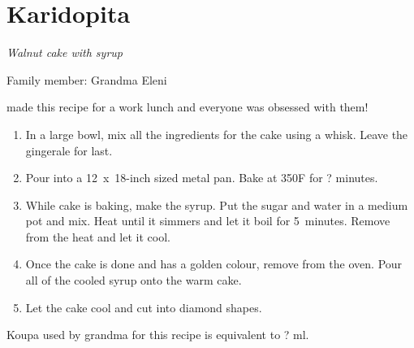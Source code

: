 \chapter{Karidopita}
\label{ch:karidopita}


\textit{Walnut cake with syrup}

Family member: Grandma Eleni

 made this recipe for a work lunch and everyone was obsessed with them!

\begin{enumerate}
    \item In a large bowl, mix all the ingredients for the cake using a whisk. Leave the gingerale for last.
    \item Pour into a 12~x~18-inch sized metal pan. Bake at 350\degree F for ? minutes.
    \item While cake is baking, make the syrup. Put the sugar and water in a medium pot and mix. Heat until it simmers and let it boil for 5~minutes. Remove from the heat and let it cool.
    \item Once the cake is done and has a golden colour, remove from the oven. Pour all of the cooled syrup onto the warm cake.
    \item Let the cake cool and cut into diamond shapes.
\end{enumerate}

Koupa used by grandma for this recipe is equivalent to ? ml.
